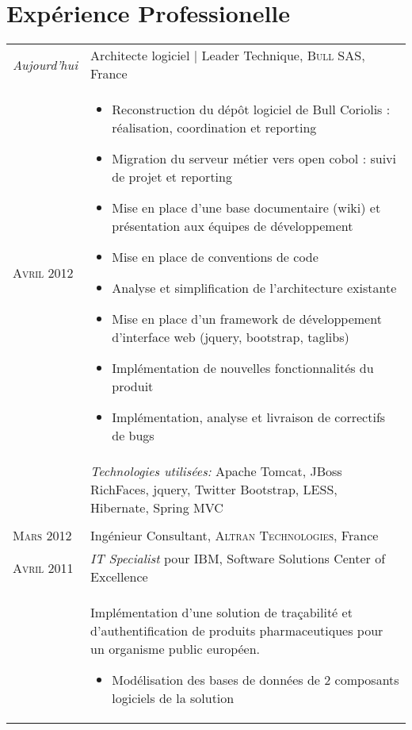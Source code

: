 \section{\texorpdfstring{\color{Blue}Expérience Professionelle}{Expérience Professionelle}}
\begin{longtable}{R{2.5cm}|p{14.8cm}}
  \emph{Aujourd'hui} & Architecte logiciel | Leader Technique, \textsc{Bull SAS}, France\\
  \textsc{Avril 2012} & 
  \vspace{-1em}
  \footnotesize{
    \begin{itemize}
      \item Reconstruction du dépôt logiciel de Bull Coriolis : réalisation, coordination et reporting
      \item Migration du serveur métier vers open cobol : suivi de projet et reporting
      \item Mise en place d'une base documentaire (wiki) et présentation aux 
      équipes de développement
      \item Mise en place de conventions de code
      \item Analyse et simplification de l'architecture existante
      \item Mise en place d'un framework de développement d'interface web (jquery, bootstrap, taglibs)
      \item Implémentation de nouvelles fonctionnalités du produit
      \item Implémentation, analyse et livraison de correctifs de bugs
    \end{itemize}
    \vspace{-1em}
  }\\&
 	\footnotesize{\emph{Technologies utilisées:} Apache Tomcat, JBoss RichFaces, jquery, Twitter Bootstrap, LESS, Hibernate, Spring MVC }\\
  \\
 	\textsc{Mars 2012} & Ingénieur Consultant, \textsc{Altran Technologies}, France\\
 	\textsc{Avril 2011}& \emph{IT Specialist} pour IBM, Software Solutions Center of Excellence\\&
 	\footnotesize{
 		Implémentation d'une solution de traçabilité et d'authentification
 	 	de produits pharmaceutiques pour un organisme public européen.
 		\begin{itemize}
			\item Modélisation des bases de données de 2 composants logiciels de la solution

\end{itemize}}
\end{longtable}
